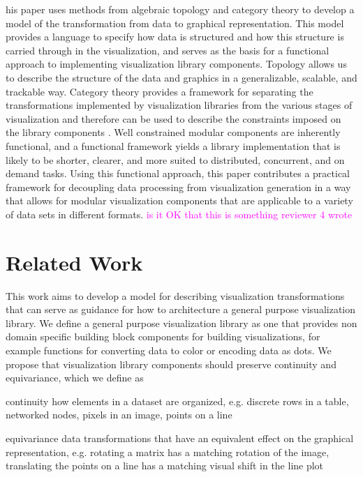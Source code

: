 \documentclass[10pt,journal,compsoc]{IEEEtran}
\newcommand{\note}[1]{\textcolor{magenta}{#1}}
\theoremstyle{definition}
\theoremstyle{remark}
\begin{document}
his paper uses methods from algebraic topology and category theory to develop a model of the transformation from data to graphical representation. This model provides a language to specify how data is structured and how this structure is carried through in the visualization, and serves as the basis for a functional approach to implementing visualization library components. Topology allows us to describe the structure of the data and graphics in a generalizable, scalable, and trackable way. Category theory provides a framework for separating the transformations implemented by visualization libraries from the various stages of visualization and therefore can be used to describe the constraints imposed on the library components \cite{wielsManagementEvolvingSpecifications1998,goguenCategoricalManifesto1991}. Well constrained modular components are inherently functional\cite{hughesWhyFunctionalProgramming1989}, and a functional framework yields a library implementation that is likely to be shorter, clearer, and more suited to distributed, concurrent, and on demand tasks\cite{huHowFunctionalProgramming2015}. Using this functional approach, this paper contributes a practical framework for decoupling data processing from visualization generation in a way that allows for modular visualization components that are applicable to a variety of data sets in different formats. \note{is it OK that this is something reviewer 4 wrote}



\section{Related Work}
This work aims to develop a model for describing visualization transformations that can serve as guidance for how to architecture a general purpose visualization library. We define a general purpose visualization library as one that provides non domain specific building block components\cite{wongsuphasawatNavigatingWideWorld2021} for building visualizations, for example functions for converting data to color or encoding data as dots. We propose that visualization library components should preserve continuity and equivariance, which we define as 

\begin{LaTeXdescription}
  \item [continuity] how elements in a dataset are organized, e.g. discrete rows in a table, networked nodes, pixels in an image, points on a line
  \item [equivariance] data transformations that have an equivalent effect on the graphical representation, e.g. rotating a matrix has a matching rotation of the image, translating the points on a line has a matching visual shift in the line plot
\end{LaTeXdescription}
\end{document}
